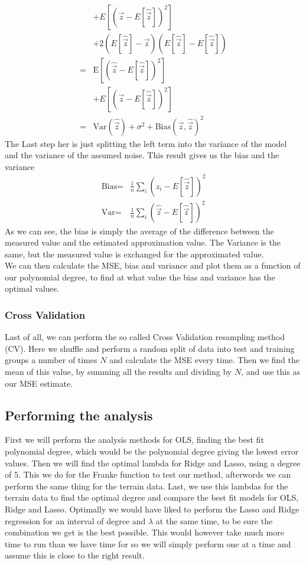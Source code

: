 \documentclass[11pt, A4paper, english]{article}
\begin{document}
\begin{multicols}{2}
\begin{align*}
&+ E \left[ \left( \vec{z} - E[\hat{\vec{z}}] \right)^2 \right] \\
&+ 2 \left( E[\hat{\vec{z}}] - \vec{z} \right) \left( E[\hat{\vec{z}}] - E[\hat{\vec{z}}] \right) \\
=& \text{E}\left[ \left( \hat{\vec{z}} - E[\hat{\vec{z}}] \right)^2 \right] \\
&+ E \left[ \left( \vec{z} - E[\hat{\vec{z}}] \right)^2 \right] \\
=& \text{Var}(\hat{\vec{z}}) + \sigma^2 + \text{Bias}(\vec{z}, \hat{\vec{z}})^2
				\end{align*}
The Last step her is just splitting the left term into the variance of the model and the variance of the assumed noise. This result gives us the bias and the variance
				\begin{align}
\text{Bias} =& \frac{1}{n} \sum_i \left( z_i - E[\hat{\vec{z}}] \right)^2 \\
\text{Var} =& \frac{1}{n} \sum_i \left( \hat{\vec{z}} - E[\hat{\vec{z}}] \right)^2
				\end{align}
As we can see, the bias is simply the average of the difference between the measured value and the estimated approximation value. The Variance is the same, but the measured value is exchanged for the approximated value. \\
We can then calculate the MSE, bias and variance and plot them as a function of our polynomial degree, to find at what value the bias and variance has the optimal values. \\

				\subsubsection{Cross Validation}
Last of all, we can perform the so called Cross Validation resampling method (CV). Here we shuffle and perform a random split of data into test and training groups a number of times $N$ and calculate the MSE every time. Then we find the mean of this value, by summing all the results and dividing by $N$, and use this as our MSE estimate.	

				\subsection{Performing the analysis}
First we will perform the analysis methods for OLS, finding the best fit polynomial degree, which would be the polynomial degree giving the lowest error values. Then we will find the optimal lambda for Ridge and Lasso, using a degree of 5. This we do for the Franke function to test our method, afterwords we can perform the same thing for the terrain data. Last, we use this lambdas for the terrain data to find the optimal degree and compare the best fit models for OLS, Ridge and Lasso. Optimally we would have liked to perform the Lasso and Ridge regression for an interval of degree and $\lambda$ at the same time, to be sure the combination we get is the best possible. This would however take much more time to run than we have time for so we will simply perform one at a time and assume this is close to the right result.


\end{multicols}
\end{document}
